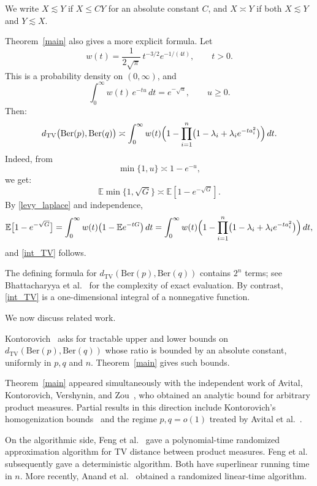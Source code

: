 \documentclass[12pt,reqno]{amsart}
\numberwithin{equation}{section}
\begin{document}
We write \(X\lesssim Y\) if \(X\le CY\) for an absolute constant \(C\), and \(X\asymp Y\) if both \(X\lesssim Y\) and \(Y\lesssim X\).
\smallskip%

Theorem~\ref{main} also gives a more explicit formula. Let
\begin{equation}\label{levy}
w(t)=\frac1{2\sqrt\pi}\,t^{-3/2}e^{-1/(4t)},\qquad t>0.
\end{equation}
This is a probability density on \((0,\infty)\), and
\begin{equation}\label{levy_laplace}
\int_0^\infty w(t)\,e^{-tu}\,dt=e^{-\sqrt u},\qquad u\ge0.
\end{equation}
Then:
\begin{equation}\label{int_TV}
d_{\mathrm{TV}}\bigl(\mathrm{Ber}(p),\mathrm{Ber}(q)\bigr)
\asymp
\int_0^\infty w(t)
\Bigl(1-\prod_{i=1}^n\bigl(1-\lambda_i+\lambda_ie^{-ta_i^2}\bigr)\Bigr)\,dt.
\end{equation}
Indeed, from
\[
\min\{1,u\}\asymp1-e^{-u},
\]
we get: 
\[
\mathbb E\min\{1,\sqrt G\}\asymp\mathbb E[1-e^{-\sqrt G}].
\]
By \eqref{levy_laplace} and independence,
\[
\mathbb E\bigl[1-e^{-\sqrt G}\bigr]
=
\int_0^\infty w(t)\bigl(1-\mathbb Ee^{-tG}\bigr)\,dt
=
\int_0^\infty w(t)
\Bigl(1-\prod_{i=1}^n\bigl(1-\lambda_i+\lambda_ie^{-ta_i^2}\bigr)\Bigr)\,dt,
\]
and \eqref{int_TV} follows.
\smallskip%

The defining formula for
\(d_{\mathrm{TV}}(\mathrm{Ber}(p),\mathrm{Ber}(q))\)
contains \(2^n\) terms; see Bhattacharyya et al.~\cite{BhattacharyyaEtAl}
for the complexity of exact evaluation.
By contrast, \eqref{int_TV} is a one-dimensional integral of a nonnegative function.
\smallskip%

We now discuss related work.

\smallskip%
Kontorovich~\cite{Kont25} asks for tractable upper and lower bounds on
\(d_{\mathrm{TV}}(\mathrm{Ber}(p),\mathrm{Ber}(q))\) whose ratio is bounded by an absolute constant, uniformly in
\(p,q\) and \(n\). Theorem~\ref{main} gives such bounds.
\smallskip%

Theorem~\ref{main} appeared simultaneously with the independent work of
Avital, Kontorovich, Vershynin, and Zou~\cite{AKVZ}, who obtained an
analytic bound for arbitrary product 
measures. Partial results in this direction include Kontorovich's homogenization bounds~\cite{Kont26} and the regime \(p,q=o(1)\) treated by Avital et al.~\cite{Avital-Kont}.
\smallskip%

On the algorithmic side, Feng et al.~\cite{FengEtAll} gave a
polynomial-time randomized approximation algorithm for TV distance
between product measures. Feng et al.~\cite{FengLiuLiu}
subsequently gave a deterministic 
algorithm. Both have superlinear running time in \(n\). More recently, Anand et al.~\cite{ABG} obtained a randomized linear-time algorithm.
\smallskip%
\end{document}
